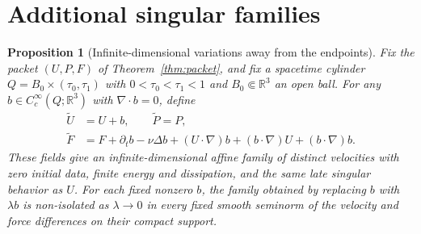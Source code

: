 \documentclass[11pt,a4paper]{article}
\newtheorem{proposition}[theorem]{Proposition}
\theoremstyle{definition}\newtheorem{definition}[theorem]{Definition}
\theoremstyle{remark}\newtheorem{remark}[theorem]{Remark}
\newcommand{\R}{\mathbb R}\newcommand{\TT}{\mathbb T^3}
\begin{document}
\section{Additional singular families}\label{sec:variants}
\begin{proposition}[Infinite-dimensional variations away from the endpoints]\label{prop:affine}
Fix the packet $(U,P,F)$ of Theorem~\ref{thm:packet}, and fix a spacetime cylinder $Q=B_0\times(\tau_0,\tau_1)$ with
$0<\tau_0<\tau_1<1$ and $B_0\Subset\R^3$ an open ball.
For any $b\in C_c^\infty(Q;\R^3)$ with $\nabla\cdot b=0$, define
\begin{align}
 \widetilde U&=U+b,\qquad \widetilde P=P,\nonumber\\
 \widetilde F&=F+\partial_tb-\nu\Delta b
       +(U\cdot\nabla)b+(b\cdot\nabla)U+(b\cdot\nabla)b.\label{eq:affine}
\end{align}
These fields give an infinite-dimensional affine family of distinct velocities with zero initial data, finite energy and dissipation, and the same late singular behavior as $U$. For each fixed nonzero $b$, the family obtained by replacing $b$ with $\lambda b$ is non-isolated as $\lambda\to0$ in every fixed smooth seminorm of the velocity and force differences on their compact support.
\end{proposition}
\end{document}
